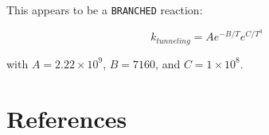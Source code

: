 \documentclass[titlepage]{article}
\begin{document}
This appears to be a \verb>BRANCHED> reaction:

\begin{equation}
k_{tunneling} = A e^{-B/T} e^{C/T^3}
\end{equation}

\noindent with $A = 2.22 \times 10^{9}$, $B = 7160$, and $C = 1 \times 10^8$.



\section{References}

\printbibliography
\end{document}
